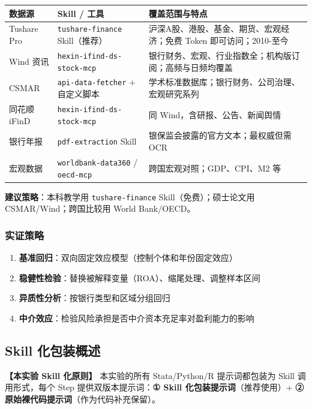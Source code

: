 \begin{table}[H]
\centering
\begin{tabular}{lp{4cm}p{7cm}}
\toprule
\textbf{数据源} & \textbf{Skill / 工具} & \textbf{覆盖范围与特点} \\
\midrule
Tushare Pro & \texttt{tushare-finance} Skill（推荐） & 沪深A股、港股、基金、期货、宏观经济；免费 Token 即可访问；2010-至今 \\
Wind 资讯 & \texttt{hexin-ifind-ds-stock-mcp} & 银行财务、宏观、行业指数全；机构版订阅；高频与日频均覆盖 \\
CSMAR & \texttt{api-data-fetcher} + 自定义脚本 & 学术标准数据库；银行财务、公司治理、宏观研究系列 \\
同花顺 iFinD & \texttt{hexin-ifind-ds-stock-mcp} & 同 Wind，含研报、公告、新闻舆情 \\
银行年报 & \texttt{pdf-extraction} Skill & 银保监会披露的官方文本；最权威但需 OCR \\
宏观数据 & \texttt{worldbank-data360} / \texttt{oecd-mcp} & 跨国宏观对照；GDP、CPI、M2 等 \\
\bottomrule
\end{tabular}
\end{table}

\textbf{建议策略}：本科教学用 \texttt{tushare-finance} Skill（免费）；硕士论文用 CSMAR/Wind；跨国比较用 World Bank/OECD。

\subsubsection{实证策略}

\begin{enumerate}[leftmargin=2em]
  \item \textbf{基准回归}：双向固定效应模型（控制个体和年份固定效应）
  \item \textbf{稳健性检验}：替换被解释变量（ROA）、缩尾处理、调整样本区间
  \item \textbf{异质性分析}：按银行类型和区域分组回归
  \item \textbf{中介效应}：检验风险承担是否中介资本充足率对盈利能力的影响
\end{enumerate}

\subsection{Skill 化包装概述}

\textbf{【本实验 Skill 化原则】} 本实验的所有 Stata/Python/R 提示词都包装为 Skill 调用形式，每个 Step 提供双版本提示词：\textbf{① Skill 化包装提示词}（推荐使用）+ \textbf{② 原始裸代码提示词}（作为代码补充保留）。

